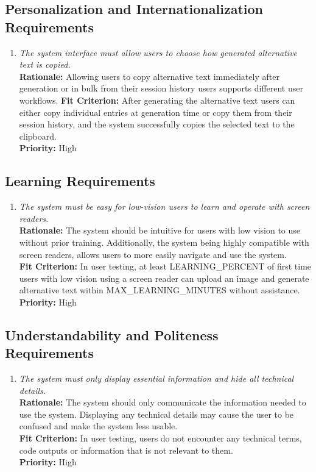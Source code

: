 \documentclass[12pt]{article}
\begin{document}
\subsection{Personalization and Internationalization Requirements}
\begin{enumerate}[label=UHR-PIR \arabic*., wide=0pt, leftmargin=*]
\item \emph{The system interface must allow users to choose how generated alternative text is copied.}\\[2mm] 
    {\bf Rationale:} Allowing users to copy alternative text immediately after generation or in bulk from their session history users supports different user workflows.
    {\bf Fit Criterion:} After generating the alternative text users can either copy individual entries at generation time or copy them from their session history, and the system successfully copies the selected text to the clipboard.\\
    {\bf Priority:} High
\end{enumerate}

\subsection{Learning Requirements}
\begin{enumerate}[label=UHR-LR \arabic*., wide=0pt, leftmargin=*]
\item \emph{The system must be easy for low-vision users to learn and operate with screen readers.}\\[2mm] 
    {\bf Rationale:} The system should be intuitive for users with low vision to use without prior training. Additionally, the system being highly compatible with screen readers, allows users to more easily navigate and use the system.  \\
    {\bf Fit Criterion:} In user testing, at least LEARNING\_PERCENT of first time users with low vision using a screen reader can upload an image and generate alternative text within MAX\_LEARNING\_MINUTES without assistance. \\
    {\bf Priority:} High
\end{enumerate}

\subsection{Understandability and Politeness Requirements}
\begin{enumerate}[label=UHR-UPR \arabic*., wide=0pt, leftmargin=*]
  \item \emph{The system must only display essential information and
    hide all technical details.}\\[2mm]
    {\bf Rationale:} The system should only communicate the
    information needed to use the system. Displaying any technical
    details may cause the user to be confused and make the system
    less usable.   \\
    {\bf Fit Criterion:} In user testing, users do not encounter any
    technical terms, code outputs or information that is not relevant
    to them.  \\
    {\bf Priority:} High
\end{enumerate}
\end{document}
